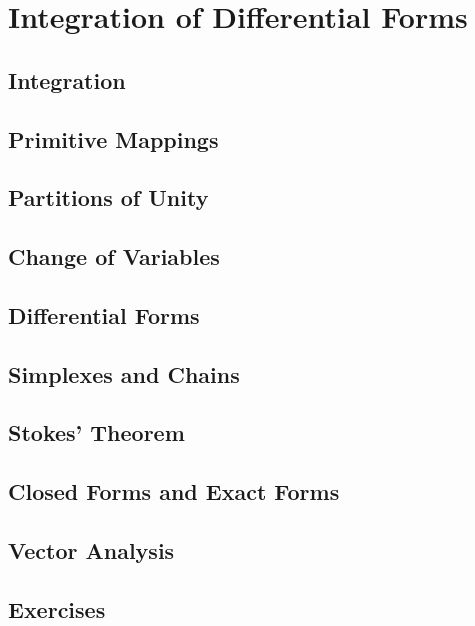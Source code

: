 \chapter{Integration of Differential Forms}
\section{Integration}
\section{Primitive Mappings}
\section{Partitions of Unity}
\section{Change of Variables}
\section{Differential Forms}
\section{Simplexes and Chains}
\section{Stokes' Theorem}
\section{Closed Forms and Exact Forms}
\section{Vector Analysis} 
\pagebreak

\section*{Exercises}
